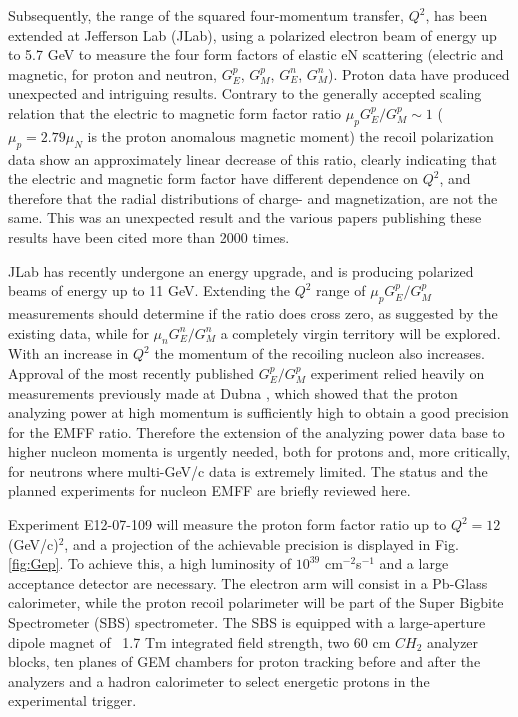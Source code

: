 \documentclass[epj]{svjour}
\begin{document}
Subsequently, the range of the squared four-momentum transfer, $Q^2$, has been extended at Jefferson Lab (JLab), using a polarized electron beam of energy up to 5.7 GeV to measure the four form factors of elastic eN scattering (electric and magnetic, for proton and neutron, $G^p_E$, $G^p_M$, $G^n_E$, $G^n_M$). Proton data have produced unexpected and intriguing results.  Contrary to the generally accepted scaling relation that the electric to magnetic form factor ratio $\mu_p G^p_E/G^p_M \sim 1$ ($\mu_p=2.79\!\mu_N$ is the proton anomalous magnetic moment) the recoil polarization data show an approximately linear decrease of this ratio,  clearly indicating that the electric and magnetic form factor have different dependence on $Q^2$, and therefore that the radial 
distributions of charge- and magnetization, are not the same.  This was an unexpected 
result and the various papers publishing these results 
\cite{Jones:1999rz,Punjabi:2005wq,Gayou:2001qd,Puckett:2011xg,Puckett:2010ac,Puckett:2017flj,Meziane:2010xc} have been cited more than 2000 times. 

JLab has recently undergone an energy upgrade, and is producing polarized beams of energy up to 11 GeV. Extending the $Q^2$ range of  $\mu_p G^p_{E}/G^p_{M}$ measurements should determine if the ratio does cross zero, as suggested by the existing data, while for $\mu_n G^n_{E}/G^n_{M}$ a completely virgin territory will be explored. With an increase in $Q^2$  the momentum of the recoiling nucleon also increases. Approval of the most recently published $G^p_E/G^p_M$ experiment \cite{Puckett:2017flj} relied heavily on measurements previously made at Dubna \cite{Azhgirey:2004yk}, which showed that the proton analyzing power at high momentum is sufficiently high to obtain a good precision for the EMFF ratio. Therefore the extension of the analyzing power data base to higher nucleon momenta is urgently needed, both for protons and, more critically, for neutrons where multi-GeV/c data is extremely limited. The status and the planned experiments for nucleon EMFF
are briefly reviewed here.

Experiment E12-07-109 \cite{PR12-07-109} will measure the proton form factor ratio up to $Q^2 = 12$~  (GeV/c)$^2$, and a projection of the achievable precision is displayed in Fig. \ref{fig:Gep}. To achieve this,  a high luminosity of $10^{39}$ cm$^{-2}$s$^{-1}$ and a large acceptance detector are necessary. The electron arm will consist in a Pb-Glass calorimeter, while the proton recoil polarimeter will be part of the  Super Bigbite Spectrometer (SBS) spectrometer. The SBS is equipped with a large-aperture dipole magnet of ~1.7 Tm integrated field strength, two 60 cm $CH_2$ analyzer blocks, ten planes of GEM chambers for proton tracking before and after the analyzers and a hadron calorimeter to select energetic protons in the experimental trigger. 
\end{document}
